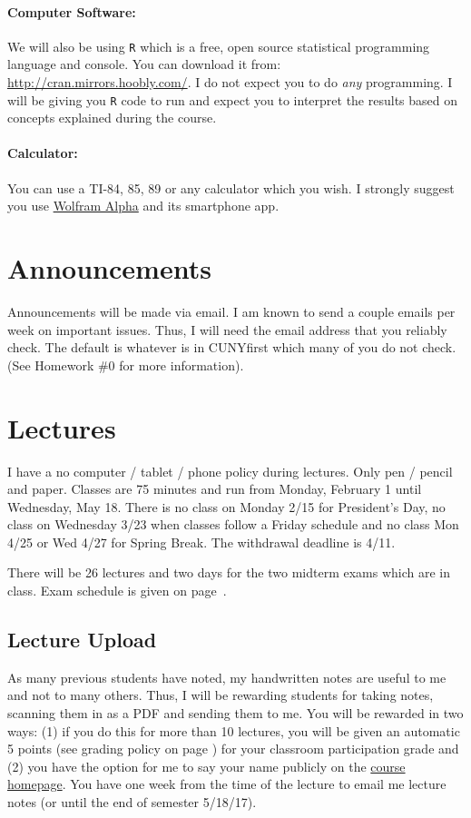 \documentclass[12pt]{article}
\newcommand{\coursewebpage}{\href{https://github.com/kapelner/QC_Math_341_Spring_2017}{course homepage}}
\begin{document}
\paragraph{Computer Software:} We will also be using \texttt{R} which is a free, open source statistical programming language and console. You can download it from: \url{http://cran.mirrors.hoobly.com/}. I do not expect you to do \textit{any} programming. I will be giving you \texttt{R} code to run and expect you to interpret the results based on concepts explained during the course.

\paragraph{Calculator:} You can use a TI-84, 85, 89 or any calculator which you wish. I strongly suggest you use \href{http://www.wolframalpha.com/}{Wolfram Alpha} and its smartphone app.

\section*{Announcements}

Announcements will be made via email. I am known to send a couple emails per week on important issues. Thus, I will need the email address that you reliably check. The default is whatever is in CUNYfirst which many of you do not check. (See Homework \#0 for more information).

\section*{Lectures}

I have a no computer / tablet / phone policy during lectures. Only pen / pencil and paper. Classes are 75 minutes and run from Monday, February 1 until Wednesday, May 18. There is no class on Monday 2/15 for President's Day, no class on Wednesday 3/23 when classes follow a Friday schedule and no class Mon 4/25 or Wed 4/27 for Spring Break. The withdrawal deadline is 4/11.

There will be 26 lectures and two days for the two midterm exams which are in class. Exam schedule is given on page~\pageref{subsec:exam_schedule}.

\subsection*{Lecture Upload}

As many previous students have noted, my handwritten notes are useful to me and not to many others. Thus, I will be rewarding students for taking notes, scanning them in as a PDF and sending them to me. You will be rewarded in two ways: (1) if you do this for more than 10 lectures, you will be given an automatic 5 points (see grading policy on page \pageref{sec:grading}) for your classroom participation grade and (2) you have the option for me to say your name publicly on the \coursewebpage. You have one week from the time of the lecture to email me lecture notes (or until the end of semester 5/18/17).
\end{document}
